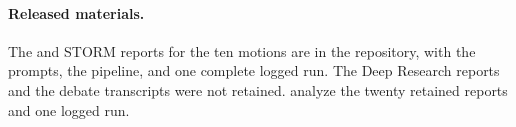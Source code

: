 \paragraph{Released materials.}
The \sys{} and STORM reports for the ten motions are in the repository, with the prompts, the pipeline, and one complete logged run. The Deep Research reports and the debate transcripts were not retained.  analyze the twenty retained reports and one logged run.

